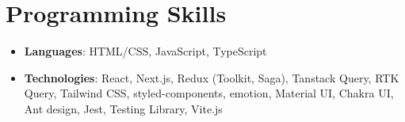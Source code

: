 \documentclass[letterpaper,11pt]{article}
\newcommand{\resumeSubHeadingListStart}{\begin{itemize}[leftmargin=*]}
\newcommand{\resumeSubHeadingListEnd}{\end{itemize}}
\begin{document}
    \section{Programming Skills}
    \resumeSubHeadingListStart

        \item{
          \textbf{Languages}{: HTML/CSS, JavaScript, TypeScript}
        }

        \item{
          \textbf{Technologies}{: React, Next.js, Redux (Toolkit, Saga), Tanstack Query, RTK Query, Tailwind CSS, styled-components, emotion, Material UI, Chakra UI, Ant design, Jest, Testing Library, Vite.js}
        }

    \resumeSubHeadingListEnd

    
\end{document}
